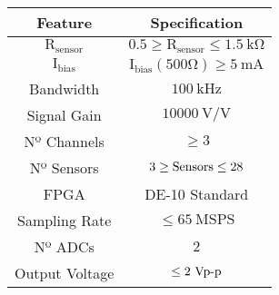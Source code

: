 \begin{tabular}{cc}
\toprule
Feature            & Specification                                              \\
\midrule                                             
$\mathrm{R_{sensor}}$   & $\mathrm{0.5 \geq R_{sensor} \leq 1.5~k\Omega}$       \\
$\mathrm{I_{bias}}$     & $\mathrm{I_{bias}(500\Omega) \geq 5~mA}$              \\
Bandwidth               & $\mathrm{100~kHz}$                                    \\
Signal Gain             & $\mathrm{10000~V/V}$                                  \\
Nº Channels             & $\mathrm{\geq 3}$                                     \\
Nº Sensors              & $\mathrm{3 \geq \textnormal{Sensors} \leq 28}$        \\
FPGA                    & DE-10 Standard                                        \\
Sampling Rate           & $\mathrm{\leq 65~MSPS}$                               \\
Nº ADCs                 & $\mathrm{2}$                                          \\
Output Voltage          & $\mathrm{\leq 2~Vp\textnormal{-}p}$                   \\
\bottomrule
\end{tabular}